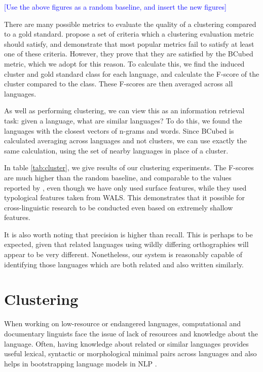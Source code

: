 \textcolor{blue}{[Use the above figures as a random baseline, and insert the new figures]}


\noindent





There are many possible metrics to evaluate the quality of a clustering compared to a gold standard.  propose a set of criteria which a clustering evaluation metric should satisfy, and demonstrate that most popular metrics fail to satisfy at least one of these criteria.  However, they prove that they are satisfied by the BCubed metric, which we adopt for this reason.  To calculate this, we find the induced cluster and gold standard class for each language, and calculate the F-score of the cluster compared to the class.  These F-scores are then averaged across all languages.

As well as performing clustering, we can view this as an information retrieval task: given a language, what are similar languages?  To do this, we found the languages with the closest vectors of n-grams and words.  Since BCubed is calculated averaging across languages and not clusters, we can use exactly the same calculation, using the set of nearby languages in place of a cluster.

In table \ref{tab:cluster}, we give results of our clustering experiments.  The F-scores are much higher than the random baseline, and comparable to the values reported by , even though we have only used surface features, while they used typological features taken from WALS.  This demonstrates that it possible for cross-linguistic research to be conducted even based on extremely shallow features.

It is also worth noting that precision is higher than recall.  This is perhaps to be expected, given that related languages using wildly differing orthographies will appear to be very different.  Nonetheless, our system is reasonably capable of identifying those languages which are both related and also written similarly.


\section{Clustering}
When working on low-resource or endangered languages, computational and documentary linguists face the issue of lack of resources and knowledge about the language. Often, having knowledge about related or similar languages provides useful lexical, syntactic or morphological minimal pairs across languages and also helps in bootstrapping language models in NLP \cite{yarowsky:ngai:2001,xia2007multilingual}.

